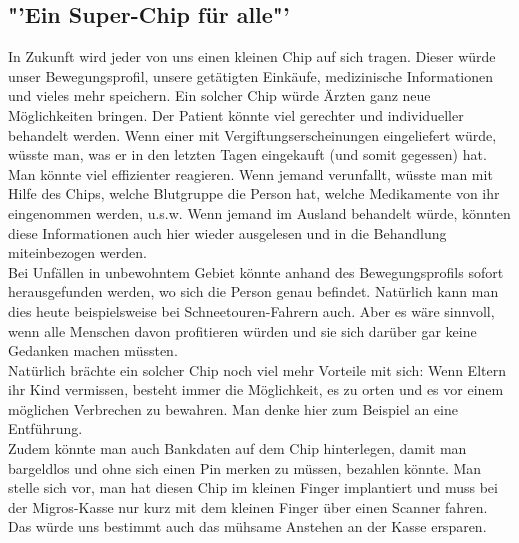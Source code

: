 \subsection{"'Ein Super-Chip für alle"'}
In Zukunft wird jeder von uns einen kleinen Chip auf 
sich tragen. Dieser würde unser Bewegungsprofil, unsere getätigten 
Einkäufe, medizinische Informationen und vieles mehr speichern. Ein 
solcher Chip würde Ärzten ganz neue Möglichkeiten bringen. 
Der Patient k\"onnte viel gerechter und individueller behandelt werden. Wenn 
einer mit Vergiftungserscheinungen eingeliefert würde, wüsste man, was 
er in den letzten Tagen eingekauft (und somit gegessen) hat. Man 
könnte viel effizienter reagieren. Wenn jemand verunfallt, wüsste man 
mit Hilfe des Chips, welche Blutgruppe die Person hat, welche 
Medikamente von ihr eingenommen werden, u.s.w. Wenn jemand im Ausland 
behandelt würde, könnten diese Informationen auch hier wieder 
ausgelesen und in die Behandlung miteinbezogen werden.\\
Bei Unfällen in unbewohntem Gebiet könnte anhand des Bewegungsprofils 
sofort herausgefunden werden, wo sich die Person genau befindet. 
Natürlich kann man dies heute beispielsweise bei Schneetouren-Fahrern 
auch. Aber es wäre sinnvoll, wenn alle Menschen davon profitieren 
würden und sie sich darüber gar keine Gedanken machen müssten.\\
Natürlich brächte ein solcher Chip noch viel mehr Vorteile mit sich: 
Wenn Eltern ihr Kind vermissen, besteht immer die Möglichkeit, es zu 
orten und es vor einem möglichen Verbrechen zu bewahren. Man denke hier 
zum Beispiel an eine Entführung. \\
Zudem könnte man auch Bankdaten auf dem Chip hinterlegen, damit man 
bargeldlos und ohne sich einen Pin merken zu müssen, bezahlen könnte. 
Man stelle sich vor, man hat diesen Chip im kleinen Finger implantiert 
und muss bei der Migros-Kasse nur kurz mit dem kleinen Finger über 
einen Scanner fahren. Das würde uns bestimmt auch das mühsame Anstehen 
an der Kasse ersparen.

